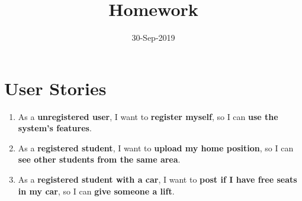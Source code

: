 \documentclass[12pt]{article}
\title{Homework}
\date{30-Sep-2019}
\begin{document}
	\maketitle
	
	\section*{User Stories}
	\begin{enumerate}
\item As a \textbf{unregistered user}, I want to \textbf{register myself}, so I can \textbf{use the system's features}.
		\item As a \textbf{registered student}, I want to \textbf{upload my home position}, so I can \textbf{see other students from the same area}.
		\item As a \textbf{registered student with a car}, I want to \textbf{post if I have free seats in my car}, so I can \textbf{give someone a lift}.
	\end{enumerate}
\end{document}
